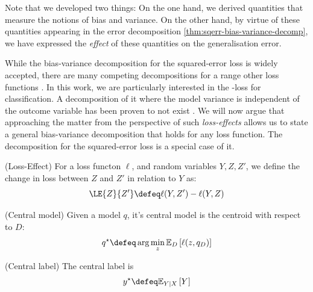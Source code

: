 \documentclass[
	twoside=false, %
]{kaobook}
\begin{document}
Note that we developed two things:
On the one hand, we derived quantities that measure the notions of bias and variance. On the other hand, by virtue of these quantities appearing in the error decomposition \ref{thm:sqerr-bias-variance-decomp}, we have expressed the \textit{effect} of these quantities on the generalisation error.

While the bias-variance decomposition for the squared-error loss is widely accepted, there are many competing decompositions for a range other loss functions 
\cite{kohavi_BiasVarianceDecomposition_,hansen_GeneralBiasVariance_2000,wood_BiasVarianceDecompositionsMargin_2022,didaci_DiversityClassifierEnsembles_2013,domingos_UnifiedBiasVarianceDecomposition_,pfau_GeneralizedBiasVarianceDecomposition_}.  
  In this work, we are particularly interested in the \zeroone-loss for classification. A decomposition of it where the model variance is independent of the outcome variable has been proven to not exist \cite{wood_UnifiedTheoryDiversity_2023}. We will now argue that approaching the matter from the perspective of such \textit{loss-effects} allows us to state a general bias-variance decomposition that holds for any loss function. The decomposition for the squared-error loss is a special case of it.
\begin{definition} (Loss-Effect) For a loss functon $\ell$, and random variables $Y, Z, Z'$, we define the change in loss between $Z$ and $Z'$ in relation to $Y$ as:
  $$
  \LE{Z}{Z'} \defeq \ell(Y, Z') - \ell(Y, Z)
  $$
  \label{def:loss-effect}
\end{definition}
\begin{definition}
\label{def:central-model}
(Central model) Given a model $q$, it's central model is the centroid with respect to $D$:
$$
q^\star \defeq \arg\min_{z} \mathbb{E}_{D}\left[ \ell(z, q_{D}) \right] 
$$
\end{definition}

\begin{definition}
\label{def:central-label}
(Central label) The central label is 
$$
y^\star \defeq \mathbb{E}_{Y|X}\left[ Y \right] 
$$
\end{definition}
\end{document}
